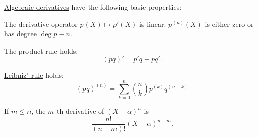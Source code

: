 \begin{proposition}\label{thm:def:algebraic_derivative}
  \hyperref[def:algebraic_derivative]{Algebraic derivatives} have the following basic properties:
  \begin{thmenum}
     The derivative operator \( p(X) \mapsto p'(X) \) is linear.
     \( p^{(n)}(X) \) is either zero or has degree \( \deg p - n \).

     The product rule holds:
    \begin{equation}\label{eq:thm:def:algebraic_derivative/product}
      (pq)' = p'q + pq'.
    \end{equation}

     \hyperref[thm:leibniz_rule]{Leibniz' rule} holds:
    \begin{equation}\label{eq:thm:def:algebraic_derivative/leibniz}
      (pq)^{(n)} = \sum_{k=0}^n \binom n k p^{(k)} q^{(n-k)}
    \end{equation}

     If \( m \leq n \), the \( m \)-th derivative of \( (X - \alpha)^n \) is
    \begin{equation*}
      \frac {n!} {(n-m)!} (X - \alpha)^{n-m}.
    \end{equation*}
  \end{thmenum}
\end{proposition}
